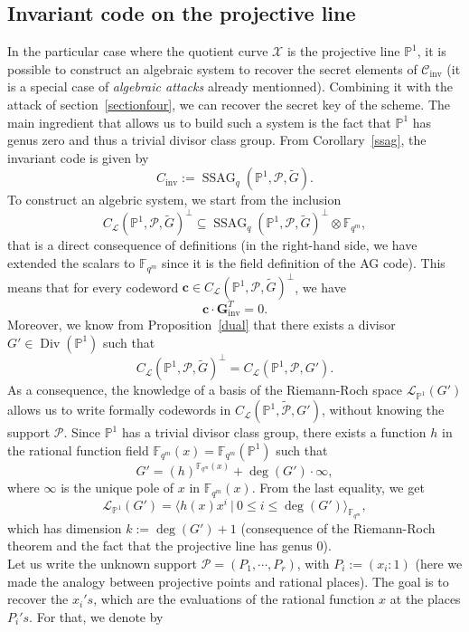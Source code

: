 \documentclass[10pt]{article}
\theoremstyle{definition}
\theoremstyle{definition}
\theoremstyle{definition}
\newcommand{\cd}{\cdot}
\newcommand{\C}{\mathcal{C}}
\newcommand{\PP}{\mathbb{P}}
\newcommand{\fqm}{\mathbb{F}_{q^m}}
\newcommand{\su}{\subseteq}
\newcommand{\X}{\mathcal{X}}
\newcommand{\PR}{\mathcal{P}}
\newcommand{\Div}{\operatorname{Div}}
\newcommand{\ssag}{\operatorname{SSAG}}
\newcommand{\calL}{\mathcal{L}}
\begin{document}
\subsection{Invariant code on the projective line} \label{section6.1}


In the particular case where the quotient curve $\X$ is the projective line $\PP^1$, it is possible to construct an algebraic system to recover the secret elements of $\C_{\mathrm{inv}}$ (it is a special case of \textit{algebraic attacks} already mentionned). Combining it with the attack of section~\ref{sectionfour}, we can  recover the secret key of the scheme. The main ingredient that allows us to build such a system is the fact that $\PP^1$ has genus zero and thus a trivial divisor class group. 
From Corollary~\ref{ssag}, the invariant code is given by 
\[C_{\mathrm{inv}} := \ssag_q(\PP^1,\PR,\tilde{G}).\]
To construct an algebric system, we start from the inclusion 
\[C_{\calL}(\PP^1,\PR,\tilde{G})^{\perp} \su \ssag_q(\PP^1,\PR,\tilde{G})^{\perp} \otimes \fqm,\]
that is a direct consequence of definitions (in the right-hand side, we have extended the scalars to $\fqm$ since it is the field definition of the AG code). This means that for every codeword $\mathbf{c} \in C_{\calL}(\PP^1,\PR,\tilde{G})^{\perp}$, we have 
\begin{equation} \label{eq12}
\mathbf{c} \cd \mathbf{G}_{\mathrm{inv}}^T = 0.
\end{equation} 
Moreover, we know from Proposition~\ref{dual} that there exists a divisor $G' \in \Div(\PP^1)$ such that
\[ C_{\calL}(\PP^1,\PR,\tilde{G})^{\perp} = C_{\calL}(\PP^1,\PR,G').\]
As a consequence, the knowledge of a basis of the Riemann-Roch space $\calL_{\mathbb{P}^1}(G')$ allows us to write formally codewords in $C_{\calL}(\PP^1,\tilde{\PR},G')$, without knowing the support $\PR$. Since $\PP^1$ has a trivial divisor class group, there exists a function $h$ in the rational function field $\fqm(x) = \fqm(\PP^1)$ such that
\[ G' = (h)^{\fqm(x)} + \deg(G') \cd \infty,\]
where $\infty$ is the unique pole of $x$ in $\fqm(x)$. From the last equality, we get
\[\calL_{\mathbb{P}^1}(G') = \langle h(x)x^i \ | \ 0 \leq i \leq \deg(G')\rangle_{\fqm},\]
which has dimension $k:=\deg(G')+1$ (consequence of the Riemann-Roch theorem and the fact that the projective line has genus $0$). \\
Let us write the unknown support $\PR = (P_1,\cdots,P_r)$, with $P_i := (x_i:1)$ (here we made the analogy between projective points and rational places). The goal is to recover the $x_i's$, which are the evaluations of the rational function $x$ at the places $P_i's$. For that, we denote by  
\end{document}
